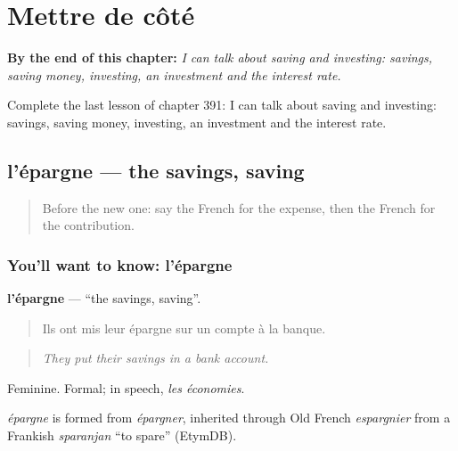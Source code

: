 
\chapter{Mettre de côté}
\label{ch:fr-mettre-de-cote}

\begin{chapteropening}
\textbf{By the end of this chapter:} \emph{I can talk about saving and investing: savings, saving money, investing, an investment and the interest rate.}

Complete the last lesson of chapter 391: I can talk about saving and investing: savings, saving money, investing, an investment and the interest rate.
\end{chapteropening}

\section[l'épargne]{l'épargne — the savings, saving}

\label{lesson:FR-C391-epargne}



\begin{quote}
Before the new one: say the French for the expense, then the French for the contribution.
\end{quote}

\subsection*{You'll want to know: l'épargne}
\textbf{l'épargne} — \textquotedblleft{}the savings, saving\textquotedblright{}.

\begin{quote}
Ils ont mis leur épargne sur un compte à la banque.
\end{quote}

\begin{quote}
\emph{They put their savings in a bank account.}
\end{quote}

Feminine. Formal; in speech, \emph{les économies}.

\begin{cousinweb}
\emph{épargne} is formed from \emph{épargner}, inherited through Old French \emph{espargnier} from a Frankish \emph{sparanjan} \textquotedblleft{}to spare\textquotedblright{} (EtymDB).
\end{cousinweb}


